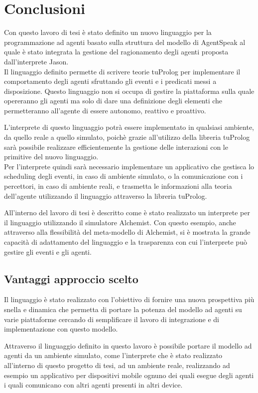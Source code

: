 \chapter{Conclusioni}
Con questo lavoro di tesi è stato definito un nuovo linguaggio per la programmazione ad agenti basato sulla struttura del modello di AgentSpeak al quale è stato integrata la gestione del ragionamento degli agenti proposta dall'interprete Jason.
\\
Il linguaggio definito permette di scrivere teorie tuProlog per implementare il comportamento degli agenti sfruttando gli eventi e i predicati messi a disposizione.
Questo linguaggio non si occupa di gestire la piattaforma sulla quale opereranno gli agenti ma solo di dare una definizione degli elementi che permetteranno all'agente di essere autonomo, reattivo e proattivo.

L'interprete di questo linguaggio potrà essere implementato in qualsiasi ambiente, da quello reale a quello simulato, poichè grazie all'utilizzo della libreria tuProlog sarà possibile realizzare efficientemente la gestione delle interazioni con le primitive del nuovo linguaggio.
\\
Per l'interprete quindi sarà necessario implementare un applicativo che gestisca lo scheduling degli eventi, in caso di ambiente simulato, o la comunicazione con i percettori, in caso di ambiente reali, e trasmetta le informazioni alla teoria dell'agente utilizzando il linguaggio attraverso la libreria tuProlog.

All'interno del lavoro di tesi è descritto come è stato realizzato un interprete per il linguaggio utilizzando il simulatore Alchemist.
Con questo esempio, anche attraverso alla flessibilità del meta-modello di Alchemist, si è mostrata la grande capacità di adattamento del linguaggio e la trasparenza con cui l'interprete può gestire gli eventi e gli agenti. 

\section{Vantaggi approccio scelto}
Il linguaggio è stato realizzato con l'obiettivo di fornire una nuova prospettiva più snella e dinamica che permetta di portare la potenza del modello ad agenti su varie piattaforme cercando di semplificare il lavoro di integrazione e di implementazione con questo modello.

Attraverso il linguaggio definito in questo lavoro è possibile portare il modello ad agenti da un ambiente simulato, come l'interprete che è stato realizzato all'interno di questo progetto di tesi, ad un ambiente reale, realizzando ad esempio un applicativo per dispositivi mobile ognuno dei quali esegue degli agenti i quali comunicano con altri agenti presenti in altri device.